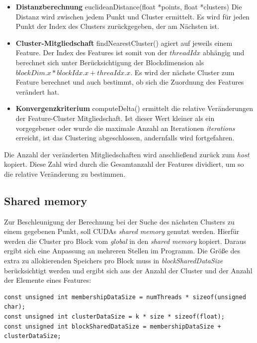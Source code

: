 \begin{itemize}
	\item \textbf{Distanzberechnung} euclideanDistance(float *points, float *clusters) Die Distanz wird zwischen jedem Punkt und Cluster ermittelt. Es wird für jeden Punkt der Index des Clusters zurückgegeben, der am Nächsten ist.
	\item \textbf{Cluster-Mitgliedschaft} findNearestCluster() agiert auf jeweils einem Feature. Der Index des Features ist somit von der $threadIdx$ abhängig und berechnet sich unter Berücksichtigung der Blockdimension als $blockDim.x * blockIdx.x + threaIdx.x$. Es wird der nächste Cluster zum Feature berechnet und auch bestimmt, ob sich die Zuordnung des Features verändert hat.
	\item \textbf{Konvergenzkriterium} computeDelta() ermittelt die relative Veränderungen der Feature-Cluster Mitgliedschaft. Ist dieser Wert kleiner als ein vorgegebener  oder wurde die maximale Anzahl an Iterationen \textit{iterations} erreicht, ist das Clustering abgeschlossen, andernfalls wird fortgefahren.
\end{itemize}

Die Anzahl der veränderten Mitgliedschaften wird anschließend zurück zum \textit{host} kopiert. Diese Zahl wird durch die Gesamtanzahl der Features dividiert, um so die relative Veränderung zu bestimmen. 

\subsection{Shared memory}

Zur Beschleunigung der Berechnung bei der Suche des nächsten Clusters zu einem gegebenen Punkt, soll CUDAs \textit{shared memory} genutzt werden. Hierfür werden die Cluster pro Block vom \textit{global} in den \textit{shared memory} kopiert. Daraus ergibt sich eine Anpassung an mehreren Stellen im Programm.  Die Größe des extra zu allokierenden Speichers pro Block muss in \textit{blockSharedDataSize} berücksichtigt werden und ergibt sich aus der Anzahl der Cluster und der Anzahl der Elemente eines Features:

\lstset{language=C}
\begin{lstlisting}
const unsigned int membershipDataSize = numThreads * sizeof(unsigned char);
const unsigned int clusterDataSize = k * size * sizeof(float);
const unsigned int blockSharedDataSize = membershipDataSize + clusterDataSize;
\end{lstlisting}


